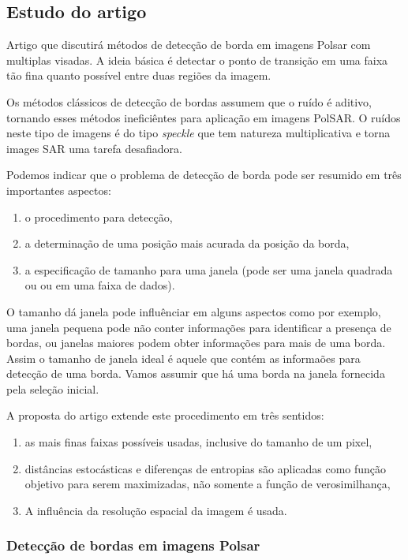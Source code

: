 \documentclass[12pt,a4paper]{article}
\begin{document}
\subsection{Estudo do artigo  \cite{nasc_frery_2014}}

Artigo que discutirá métodos de detecção de borda em imagens Polsar com multiplas visadas. A ideia básica é detectar o ponto de transição em uma faixa tão fina quanto possível entre duas regiões da imagem.

Os métodos clássicos de detecção de bordas assumem que o ruído é aditivo, tornando esses métodos ineficiêntes para aplicação em imagens PolSAR. O ruídos neste tipo de imagens é do tipo {\it speckle} que tem natureza multiplicativa e torna images SAR uma tarefa desafiadora.

Podemos indicar que o problema de detecção de borda pode ser resumido em três importantes aspectos:
\begin{enumerate}
	\item o procedimento para detecção,
	\item a determinação de uma posição mais acurada da posição da borda,
	\item a especificação de tamanho para uma janela (pode ser uma janela quadrada ou ou em uma faixa de dados). 
\end{enumerate}

O tamanho dá janela pode influênciar em alguns aspectos como por exemplo, uma janela pequena pode não conter informações para identificar a presença de bordas, ou janelas maiores podem obter informações para mais de uma borda. Assim o tamanho de janela ideal é aquele que contém as informaões para detecção de uma borda. Vamos assumir que há uma borda na janela fornecida pela seleção inicial.

A proposta do artigo extende este procedimento em três sentidos:
\begin{enumerate}
	\item as mais finas faixas possíveis usadas, inclusive do tamanho de um pixel,
	\item distâncias estocásticas e diferenças de entropias são aplicadas como função objetivo para serem maximizadas, não somente a função de verosimilhança,
	\item A influência da resolução espacial da imagem é usada. 
\end{enumerate}

\subsubsection{Detecção de bordas em imagens Polsar}
\end{document}
